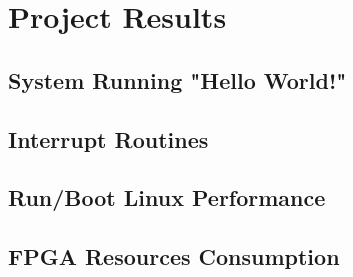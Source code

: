 \chapter{Project Results}

\section{System Running "Hello World!"}

\section{Interrupt Routines}

\section{Run/Boot Linux Performance}

\section{FPGA Resources Consumption}